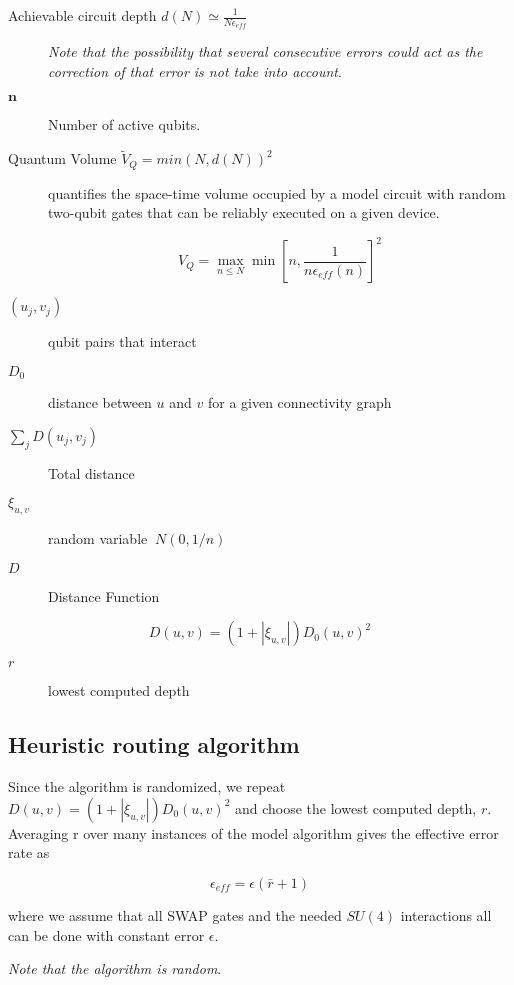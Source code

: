\documentclass[11pt]{article}
\begin{document}
\begin{description}
\item[{Achievable circuit depth \(d(N) \simeq \frac{1}{N \epsilon_{eff}}\)}] \emph{Note that the possibility that several consecutive errors could act as the correction of that error is not take into account}.
\item[{\(\textbf{n}\)}] Number of active qubits.
\item[{Quantum Volume \(\tilde{V}_Q = min (N, d(N))^2\)}] quantifies the space-time volume occupied by a model circuit with random two-qubit gates that can be reliably executed on a given device.

$$V_Q = \max_{n \le N} \min \left[ n,\frac{1}{n \epsilon_{eff} (n)}\right]^2$$

\item[{\((u_j, v_j)\)}] qubit pairs that interact

\item[{\(D_0\)}] distance between \(u\) and \(v\) for a given connectivity graph

\item[{\(\sum_j D(u_j,v_j)\)}] Total distance

\item[{\(\xi_{u,v}\)}] random variable \(~N(0,1/n)\)
\item[{\(D\)}] Distance Function
\end{description}

$$D(u,v) = (1+|\xi_{u,v}|) D_0 (u,v)^2$$

\begin{description}
\item[{\(r\)}] lowest computed depth
\end{description}
\subsection{Heuristic routing algorithm}
\label{sec:orgfe2a898}

Since the algorithm is randomized, we repeat \(D(u,v) = (1+|\xi_{u,v}|) D_0 (u,v)^2\) and choose the lowest computed depth, \(r\).
Averaging r over many instances of the model algorithm gives the effective error rate as

$$\epsilon_{eff} = \epsilon (\bar{r} + 1)$$

where we assume that all SWAP gates and the needed \(SU (4)\) interactions all can be done with constant error \(\epsilon\).

\emph{Note that the algorithm is random}.
\end{document}
